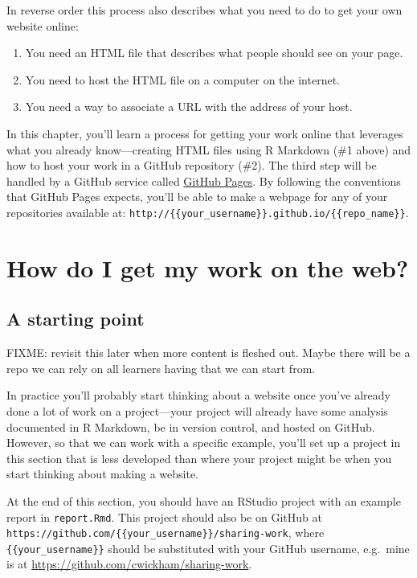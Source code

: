\documentclass[]{Nemilov}
\providecommand{\tightlist}{%
  \setlength{\itemsep}{0pt}\setlength{\parskip}{0pt}}
\begin{document}
In reverse order this process also describes what you need to do to get your own website online:

\begin{enumerate}
\def\labelenumi{\arabic{enumi}.}
\tightlist
\item
  You need an HTML file that describes what people should see on your page.
\item
  You need to host the HTML file on a computer on the internet.
\item
  You need a way to associate a URL with the address of your host.
\end{enumerate}

In this chapter, you'll learn a process for getting your work online that leverages what you already know---creating HTML files using R Markdown (\#1 above) and how to host your work in a GitHub repository (\#2). The third step will be handled by a GitHub service called \href{https://pages.github.com/}{GitHub Pages}. By following the conventions that GitHub Pages expects, you'll be able to make a webpage for any of your repositories available at: \texttt{http://\{\{your\_username\}\}.github.io/\{\{repo\_name\}\}}.

\hypertarget{how-do-i-get-my-work-on-the-web}{%
\section{How do I get my work on the web?}\label{how-do-i-get-my-work-on-the-web}}

\hypertarget{a-starting-point}{%
\subsection{A starting point}\label{a-starting-point}}

FIXME: revisit this later when more content is fleshed out. Maybe there will be a repo we can rely on all learners having that we can start from.

In practice you'll probably start thinking about a website once you've already done a lot of work on a project---your project will already have some analysis documented in R Markdown, be in version control, and hosted on GitHub. However, so that we can work with a specific example, you'll set up a project in this section that is less developed than where your project might be when you start thinking about making a website.

At the end of this section, you should have an RStudio project with an example report in \texttt{report.Rmd}. This project should also be on GitHub at \texttt{https://github.com/\{\{your\_username\}\}/sharing-work}, where \texttt{\{\{your\_username\}\}} should be substituted with your GitHub username, e.g.~mine is at \url{https://github.com/cwickham/sharing-work}.
\end{document}
